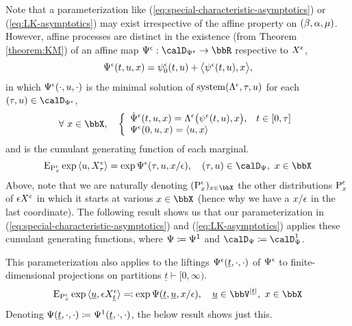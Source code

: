 Note that a parameterization like (\ref{eq:special-characteristic-asymptotics}) or (\ref{eq:LK-asymptotics}) may exist irrespective of the affine property on $(\beta, \alpha, \mu)$.
However, affine processes are distinct in the existence (from Theorem \ref{theorem:KM}) of an affine map $\aff^\epsilon: \momentSpacee \rightarrow \bbR$ respective to $X^\epsilon$,
\begin{equation*}
  \Psi^\epsilon(t, u, x) = \psi^\epsilon_0(t,u) + {\big\langle \psi^\epsilon(t,u) , x \big\rangle},
\end{equation*}
in which $\Psi^\epsilon(\cdot, u, \cdot)$ is the minimal solution of $\operatorname{system}(\Lambda^\epsilon, \tau, u)$ for each $(\tau, \momentVar) \in \momentSpacee$,
\begin{equation*}
  \forall~ \stateVar \in \stateSpace, \quad \left\{\begin{array}{ll}
    \displaystyle \dot\aff^\epsilon(t, \momentVar, \stateVar) = \ode^\epsilon\big( \affPart^\epsilon(t, \momentVar), \stateVar \big), & t \in [0,\tau] \\
    \aff^\epsilon(0, \momentVar, \stateVar) = \prj{\momentVar}{\stateVar}
  \end{array}\right.
\end{equation*}
and is the cumulant generating function of each marginal.
\begin{equation*}
  \Exp_{\Prb^\epsilon_\stateVar} \exp\prj{\momentVar}{\Xee_\tau} = \exp\aff^\epsilon(\tau, \momentVar, \stateVar/\epsilon), \quad (\tau, \momentVar) \in \momentSpace, ~ \stateVar \in \stateSpace
\end{equation*}
Above, note that we are naturally denoting $(\Prb^\epsilon_\stateVar)_{\stateVar\in\stateSpace}$ the other distributions ${\operatorname{P}}^\epsilon_x$ of $\epsilon X^\epsilon$ in which it starts at various $\stateVar \in \stateSpace$ (hence why we have a $x/\epsilon$ in the last coordinate).
The following result shows us that our parameterization in (\ref{eq:special-characteristic-asymptotics}) and (\ref{eq:LK-asymptotics}) applies these cumulant generating functions, where $\Psi \coloneqq \Psi^1$ and $\momentSpace \defeq \momentSpace^1$.




This parameterization also applies to the liftings $\Psi^\epsilon(\underline t, \cdot, \cdot)$ of $\Psi^\epsilon$ to finite-dimensional projections on partitions $\underline t \vdash [0,\infty)$.
\begin{equation*}
  \Exp_{\Prb^\epsilon_\stateVar}\exp\prj{\underline\momentVar}{\Xe_{\underline t}} \eqdef \exp\aff(\underline t, \underline\momentVar, \stateVar/\epsilon), \quad \underline\momentVar \in \vecSpace^{|\underline t|}, ~ \stateVar\in \stateSpace
\end{equation*}
Denoting $\Psi(\underline t, \cdot, \cdot) \coloneqq \Psi^1(\underline t, \cdot, \cdot)$, the below result shows just this.

